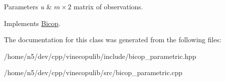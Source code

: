 \begin{DoxyParams}{Parameters}
{\em u} & $m \times 2$ matrix of observations. \\
\hline
\end{DoxyParams}


Implements \hyperlink{class_bicop_a0ff40d8054e11ed8aaa4956c7fd84e89}{Bicop}.



The documentation for this class was generated from the following files\+:\begin{DoxyCompactItemize}
\item 
/home/n5/dev/cpp/vinecopulib/include/bicop\+\_\+parametric.\+hpp\item 
/home/n5/dev/cpp/vinecopulib/src/bicop\+\_\+parametric.\+cpp\end{DoxyCompactItemize}
